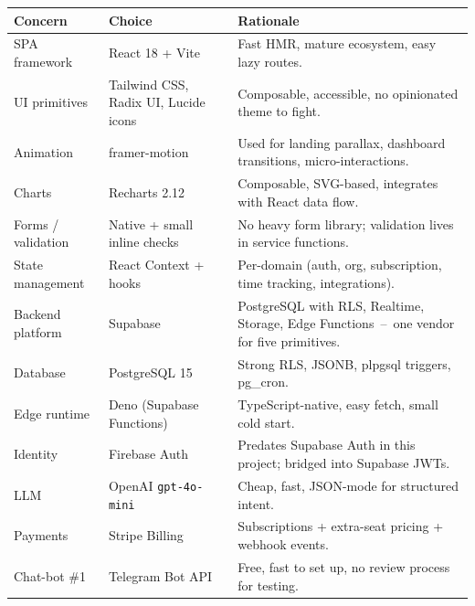 \documentclass[11pt,a4paper,oneside]{article}
\newcommand{\code}[1]{\texttt{\small #1}}
\newcommand{\dash}{\,--\,}
\begin{document}
\begin{table}[H]
\centering
\small
\begin{tabularx}{\textwidth}{@{}llX@{}}
\toprule
\textbf{Concern}      & \textbf{Choice}                                    & \textbf{Rationale} \\
\midrule
SPA framework         & React 18 + Vite                                   & Fast HMR, mature ecosystem, easy lazy routes. \\
UI primitives         & Tailwind CSS, Radix UI, Lucide icons              & Composable, accessible, no opinionated theme to fight. \\
Animation             & framer-motion                                     & Used for landing parallax, dashboard transitions, micro-interactions. \\
Charts                & Recharts 2.12                                     & Composable, SVG-based, integrates with React data flow. \\
Forms / validation    & Native + small inline checks                      & No heavy form library; validation lives in service functions. \\
State management      & React Context + hooks                             & Per-domain (auth, org, subscription, time tracking, integrations). \\
Backend platform      & Supabase                                          & PostgreSQL with RLS, Realtime, Storage, Edge Functions \dash{} one vendor for five primitives. \\
Database              & PostgreSQL 15                                     & Strong RLS, JSONB, plpgsql triggers, pg\_cron. \\
Edge runtime          & Deno (Supabase Functions)                         & TypeScript-native, easy fetch, small cold start. \\
Identity              & Firebase Auth                                     & Predates Supabase Auth in this project; bridged into Supabase JWTs. \\
LLM                   & OpenAI \code{gpt-4o-mini}                          & Cheap, fast, JSON-mode for structured intent. \\
Payments              & Stripe Billing                                    & Subscriptions + extra-seat pricing + webhook events. \\
Chat-bot \#1          & Telegram Bot API                                  & Free, fast to set up, no review process for testing. \\

\end{tabularx}
\end{table}
\end{document}
